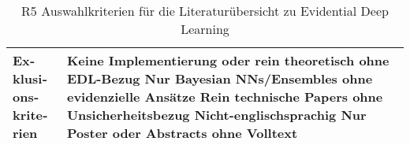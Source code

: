 \begin{otherlanguage}{ngerman}
\begin{table}[htbp]
\begin{tabularx}{\textwidth}{|l|X|}
\textbf{Exklusionskriterien} &
Keine Implementierung oder rein theoretisch ohne EDL-Bezug \newline
Nur Bayesian NNs/Ensembles ohne evidenzielle Ansätze \newline
Rein technische Papers ohne Unsicherheitsbezug \newline
Nicht-englischsprachig \newline
Nur Poster oder Abstracts ohne Volltext \\ \hline

\end{tabularx}
\caption{R5 Auswahlkriterien für die Literaturübersicht zu Evidential Deep Learning}
\label{tab:auswahlkriterien}
\end{table}


















\end{otherlanguage}
